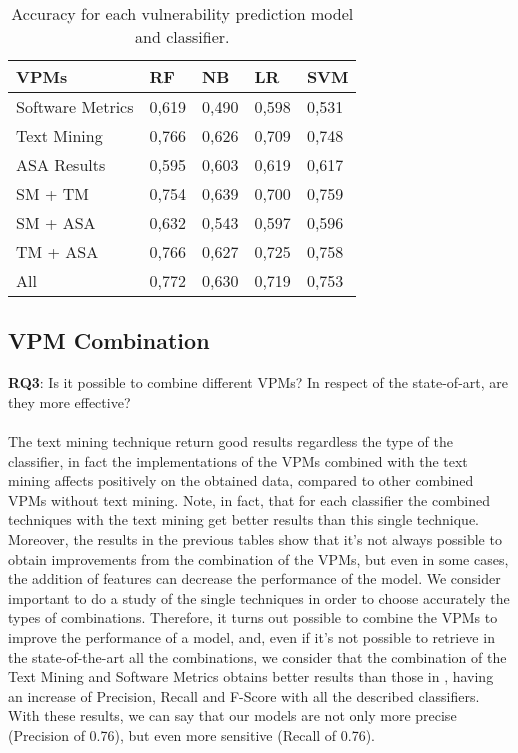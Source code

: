 \documentclass[twocolumn,10pt]{asme2ej}
\begin{document}
\begin{table}[h]
\label{tab:accuracy}
\centering
\caption{Accuracy for each vulnerability prediction model and classifier.}
\begin{tabular}{|l|l|l|l|l|} 
\hline
VPMs             & RF & NB & LR & SVM  \\ 
\hline
Software Metrics &      0,619     &   0,490   &  0,598 &        0,531\\
Text Mining      &      0,766     &   0,626     &  0,709 &      0,748 \\
ASA Results      &      0,595    &   0,603     &  0,619 &       0,617 \\
SM + TM          &      0,754     &   0,639      & 0,700 &      0,759  \\
SM + ASA         &      0,632    &   0,543      & 0,597 &       0,596\\
TM + ASA         &      0,766     &   0,627      & 0,725 &      0,758 \\
All              &      0,772     &   0,630      & 0,719 &      0,753  \\
            
                 
                 
              
\hline
\end{tabular}
\end{table}




\subsection{VPM Combination}
\textbf{RQ3}: Is it possible to combine different VPMs? In respect of the state-of-art, are they more effective?\\
\\

The text mining technique return good results regardless the type of the classifier, in fact the implementations of the VPMs combined with the text mining affects positively on the obtained data, compared to other combined VPMs without text mining. Note, in fact, that for each classifier the combined techniques with the text mining get better results than this single technique.
Moreover, the results in the previous tables show that it's not always possible to obtain improvements from the combination of the VPMs, but even in some cases, the addition of features can decrease the performance of the model. We consider important to do a study of the single techniques in order to choose accurately the types of combinations.
Therefore, it turns out possible to combine the VPMs to improve the performance of a model, and, even if it's not possible to retrieve in the state-of-the-art all the combinations, we consider that the combination of the Text Mining and Software Metrics obtains better results than those in \cite{Theisen}, having an increase of Precision, Recall and F-Score with all the described classifiers. With these results, we can say that our models are not only more precise (Precision of 0.76), but even more sensitive (Recall of 0.76).
\end{document}
